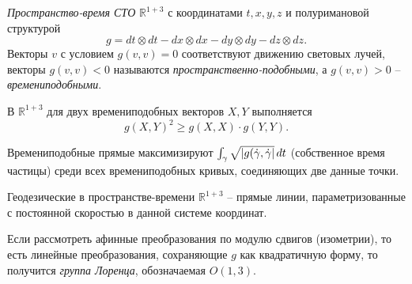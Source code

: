 \begin{to_def} 
    \textit{Пространство-время  СТО} $\mathbb{R}^{1+3}$ с координатами $t, x, y, z$ и полуримановой структурой 
    \begin{equation*}
        g = dt \otimes dt - dx \otimes dx - dy \otimes dy - dz \otimes dz.
    \end{equation*}
    Векторы $v$ с условием $g(v, v) = 0$ соответствуют движению световых лучей, векторы $g(v, v) < 0$ называются \textit{пространственно-подобными}, а $g(v, v) > 0$ -- \textit{времениподобными}.
\end{to_def}

\begin{to_lem}
     В $\mathbb{R}^{1+3}$ для двух времениподобных векторов $X, Y$ выполняется
     \begin{equation*}
         g(X, Y)^2 \geq g(X, X) \cdot g(Y, Y).
     \end{equation*}
\end{to_lem}

\begin{to_lem} 
    Времениподобные прямые максимизируют $\int_\gamma \sqrt{|g(\dot{\gamma}, \dot{\gamma}|} \, d t$ (собственное время частицы) среди всех времениподобных кривых, соединяющих две данные точки. 
\end{to_lem}

\begin{to_lem} 
    Геодезические в пространстве-времени $\mathbb{R}^{1+3}$ -- прямые линии, параметризованные с постоянной скоростью в данной системе координат.
\end{to_lem}

\begin{to_def} 
    Если рассмотреть афинные преобразования по модулю сдвигов (изометрии), то есть линейные преобразования, сохраняющие $g$ как квадратичную форму, то получится \textit{группа Лоренца}, обозначаемая $O(1, 3)$. 
\end{to_def}

